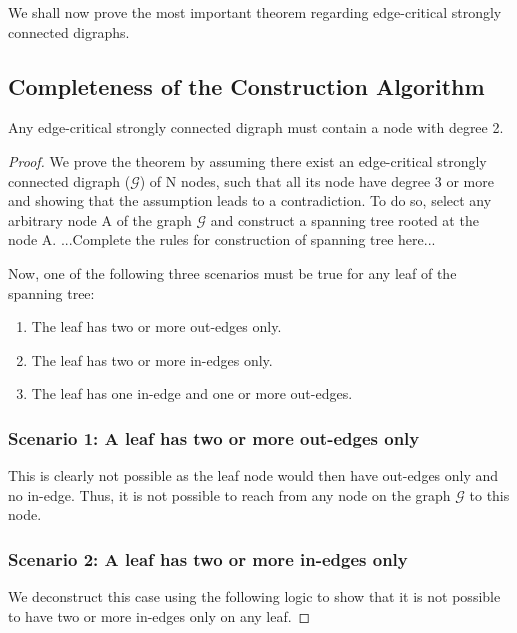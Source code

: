 \documentclass[runningheads]{llncs}
\begin{document}
\noindent We shall now prove the most important theorem regarding edge-critical strongly connected digraphs.

\subsection{Completeness of the Construction Algorithm}

\begin{theorem}
Any edge-critical strongly connected digraph must contain a node with degree 2.
\end{theorem}

\begin{proof}
We prove the theorem by assuming there exist an edge-critical strongly connected digraph ($\mathcal{G}$) of N nodes, such that all its node have degree 3 or more and showing that the assumption leads to a contradiction. To do so, select any arbitrary node A of the graph $\mathcal{G}$ and construct a spanning tree rooted at the node A. ...Complete the rules for construction of spanning tree here...

\vspace{0.5em} %
\noindent Now, one of the following three scenarios must be true for any leaf of the spanning tree:
\begin{enumerate}
    \item The leaf has two or more out-edges only.
    \item The leaf has two or more in-edges only.
    \item The leaf has one in-edge and one or more out-edges.
\end{enumerate}

\subsubsection{Scenario 1: A leaf has two or more out-edges only} This is clearly not possible as the leaf node would then have out-edges only and no in-edge. Thus, it is not possible to reach from any node on the graph $\mathcal{G}$ to this node.

\subsubsection{Scenario 2: A leaf has two or more in-edges only} We deconstruct this case using the following logic to show that it is not possible to have two or more in-edges only on any leaf.


\end{proof}
\end{document}
